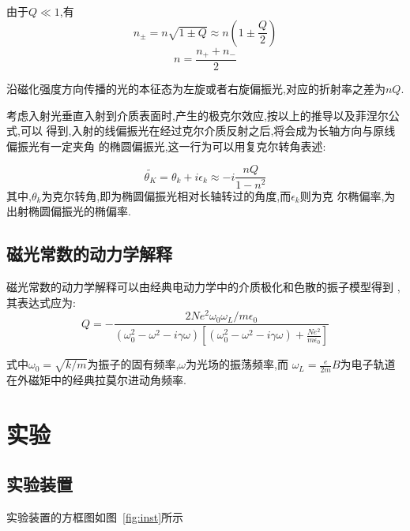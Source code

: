 \documentclass[aps,pre,12pt,preprint,onecolumn,showpacs,showkeys]{revtex4-1}
\begin{document}
由于$Q\ll 1$,有
\begin{equation}
    n_{\pm} = n \sqrt{1\pm Q} \approx n(1 \pm \frac{Q}{2})
\end{equation}
\begin{equation}
    n = \frac{n_+ + n_-}{2}
\end{equation}

沿磁化强度方向传播的光的本征态为左旋或者右旋偏振光,对应的折射率之差为$nQ$.

考虑入射光垂直入射到介质表面时,产生的极克尔效应,按以上的推导以及菲涅尔公式,可以
得到,入射的线偏振光在经过克尔介质反射之后,将会成为长轴方向与原线偏振光有一定夹角
的椭圆偏振光,这一行为可以用复克尔转角表述:

\begin{equation}
    \widetilde{\theta_K}  = \theta_k + i \epsilon_k \approx - i \frac{nQ}{1 - n^2}
\end{equation}
其中,$\theta_k$为克尔转角,即为椭圆偏振光相对长轴转过的角度,而$\epsilon_k$则为克
尔椭偏率,为出射椭圆偏振光的椭偏率.

\subsection{磁光常数的动力学解释}

磁光常数的动力学解释可以由经典电动力学中的介质极化和色散的振子模型得到
\cite{Landau}\cite{mo},其表达式应为:
\begin{equation}
   Q = - \frac{2Ne^2\omega_0\omega_L/m\epsilon_0}{(\omega_0^2- \omega^2 -
       i\gamma\omega)\left[(\omega_0^2 - \omega^2 - i\gamma\omega) +
           \frac{Ne^2}{m\epsilon_0}\right]} 
\end{equation}

式中$\omega_0 = \sqrt{k / m}$为振子的固有频率,$\omega$为光场的振荡频率,而
$\omega_L = \frac{e}{2m}B$为电子轨道在外磁矩中的经典拉莫尔进动角频率.

\section{实验}

\subsection{实验装置}

实验装置的方框图如图~\ref{fig:inst}所示
\end{document}
